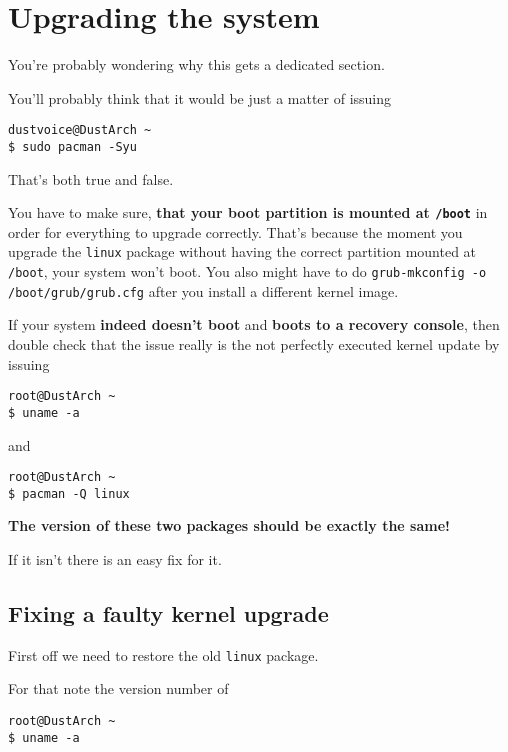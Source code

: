 \documentclass[9pt]{report}
\begin{document}
\vfill\eject

\hypertarget{x-upgrading-the-system}{\chapter{Upgrading the system}}
You’re probably wondering why this gets a dedicated section.


You’ll probably think that it would be just a matter of issuing


\begin{verbatim}
dustvoice@DustArch ~
$ sudo pacman -Syu
\end{verbatim}

That’s both true and false.


You have to make sure, \textbf{that your boot partition is mounted at \texttt{/boot}} in order for everything to upgrade correctly.
That’s because the moment you upgrade the \texttt{linux} package without having the correct partition mounted at \texttt{/boot}, your system won’t boot.
You also might have to do \texttt{grub-mkconfig -o /boot/grub/grub.cfg} after you install a different kernel image.


If your system \textbf{indeed doesn’t boot} and \textbf{boots to a recovery console}, then double check that the issue really is the not perfectly executed kernel update by issuing


\begin{verbatim}
root@DustArch ~
$ uname -a
\end{verbatim}

and


\begin{verbatim}
root@DustArch ~
$ pacman -Q linux
\end{verbatim}

\textbf{The version of these two packages should be exactly the same!}


If it isn’t there is an easy fix for it.



\vfill\eject

\hypertarget{x-fixing-a-faulty-kernel-upgrade}{\section{Fixing a faulty kernel upgrade}}
First off we need to restore the old \texttt{linux} package.


For that note the version number of


\begin{verbatim}
root@DustArch ~
$ uname -a
\end{verbatim}
\end{document}
